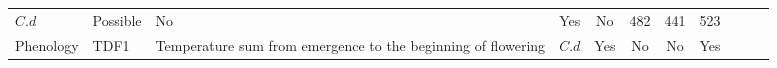 \documentclass[a4paper]{article}
\begin{document}
\begin{longtable}[]{@{}llllccccrrr@{}}
\begin{minipage}[t]{0.06\columnwidth}
\(C.d\)\strut
\end{minipage} & \begin{minipage}[t]{0.06\columnwidth}\centering\strut
Possible\strut
\end{minipage} & \begin{minipage}[t]{0.08\columnwidth}\centering\strut
No\strut
\end{minipage} & \begin{minipage}[t]{0.05\columnwidth}\centering\strut
Yes\strut
\end{minipage} & \begin{minipage}[t]{0.04\columnwidth}\centering\strut
No\strut
\end{minipage} & \begin{minipage}[t]{0.04\columnwidth}\raggedleft\strut
482\strut
\end{minipage} & \begin{minipage}[t]{0.04\columnwidth}\raggedleft\strut
441\strut
\end{minipage} & \begin{minipage}[t]{0.04\columnwidth}\raggedleft\strut
523\strut
\end{minipage}\tabularnewline
\begin{minipage}[t]{0.08\columnwidth}\raggedright\strut
Phenology\strut
\end{minipage} & \begin{minipage}[t]{0.05\columnwidth}\raggedright\strut
TDF1\strut
\end{minipage} & \begin{minipage}[t]{0.19\columnwidth}\raggedright\strut
Temperature sum from emergence to the beginning of flowering\strut
\end{minipage} & \begin{minipage}[t]{0.06\columnwidth}\raggedright\strut
\(C.d\)\strut
\end{minipage} & \begin{minipage}[t]{0.06\columnwidth}\centering\strut
Yes\strut
\end{minipage} & \begin{minipage}[t]{0.08\columnwidth}\centering\strut
No\strut
\end{minipage} & \begin{minipage}[t]{0.05\columnwidth}\centering\strut
No\strut
\end{minipage} & \begin{minipage}[t]{0.04\columnwidth}\centering\strut
Yes\strut
\end{minipage} & \begin{minipage}[t]{0.04\columnwidth}\raggedleft\strut

\end{minipage}
\end{longtable}
\end{document}
